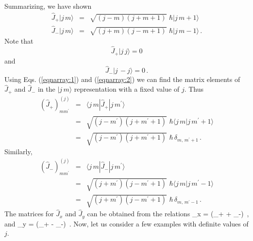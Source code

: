 Summarizing, we have shown
\begin{eqnarray}
\hat{J}_+ |j\, m\rangle &=& \sqrt{(j-m)(j+m+1)}\,\, \hbar |j\, m+1\rangle \label{eqnarray:1} \\ 
\hat{J}_-|j\,m\rangle & = & \sqrt{(j+m)(j-m+1)}\,\, \hbar |j\, m-1\rangle \, .
\label{eqnarray:2}
\label{chapter16.eqn.angular-momentum-raising-lowering}
\end{eqnarray}
Note that
\[ \hat{J}_+ |j\, j\rangle = 0 \]
and
\[ \hat{J}_-|j\, -j\rangle = 0 \, . \]
Using Eqs. (\ref{eqnarray:1}) and (\ref{eqnarray:2}) we can find the matrix elements of $\hat{J}_+$ and $\hat{J}_-$ in the $|j\,m\rangle$ representation
with a fixed value of $j$. Thus
\begin{eqnarray}
\left( \hat{J}_+\right)_{mm^{\prime}}^{(j)} & = & \langle j\, m|\hat{J}_+|j\, m^{\prime}\rangle \nonumber \\
& = & \sqrt{(j-m^{\prime})(j+m^{\prime}+1)}\,\, \hbar \langle j\, m|j\, m^{\prime}+1 \rangle \nonumber \\
& = & \sqrt{(j-m^{\prime})(j+m^{\prime}+1)}\,\, \hbar \, \delta_{m,\, m^{\prime}+1}\, .
\end{eqnarray}	
Similarly,
\begin{eqnarray}
\left( \hat{J}_-\right)_{mm^{\prime}}^{(j)} & = & \langle j\, m|\hat{J}_-|j\, m^{\prime}\rangle \nonumber \\
& = & \sqrt{(j+m^{\prime})(j-m^{\prime}+1)}\,\, \hbar \langle j\, m|j\, m^{\prime}-1 \rangle \nonumber \\
& = & \sqrt{(j+m^{\prime})(j-m^{\prime}+1)}\,\, \hbar \, \delta_{m,\, m^{\prime}-1}\, .
\end{eqnarray}	
The matrices for $\hat{J}_x$ and $\hat{J}_y$ can be obtained from the relations
\be
{}_x = (_+ + _-)\, , 
\ee
and
\be
{}_y = (_+ - _-)\, .
\ee
Now, let us consider a few examples with definite values of $j$.


